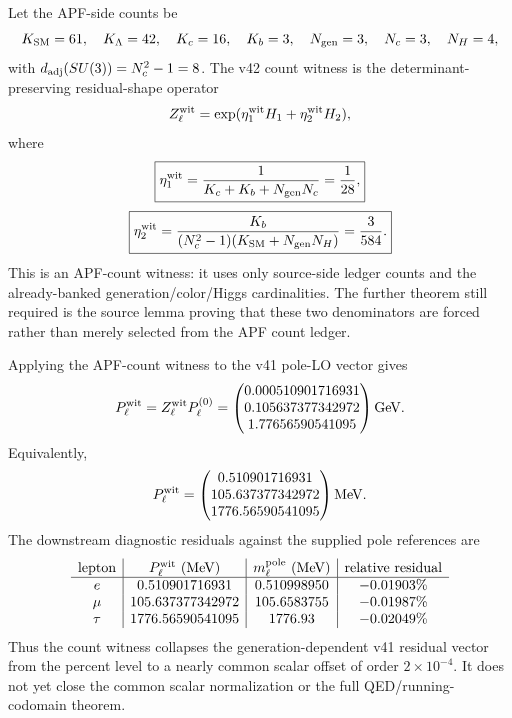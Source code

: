 \begin{definition}\label{def:apf-count-residual-witness-v42}
Let the APF-side counts be
\[
  K_{\rm SM}=61,\quad K_\Lambda=42,\quad K_c=16,\quad K_b=3,
  \quad N_{\rm gen}=3,\quad N_c=3,\quad N_H=4,
\]
with \(d_{\rm adj}(SU(3))=N_c^2-1=8\).  The v42 count witness is the determinant-preserving residual-shape operator
\[
  Z_\ell^{\rm wit}
  =\exp(\eta_1^{\rm wit}H_1+\eta_2^{\rm wit}H_2),
\]
where
\[
  \boxed{
  \eta_1^{\rm wit}
  ={1\over K_c+K_b+N_{\rm gen}N_c}
  ={1\over28},}
\]
\[
  \boxed{
  \eta_2^{\rm wit}
  ={K_b\over (N_c^2-1)(K_{\rm SM}+N_{\rm gen}N_H)}
  ={3\over584}.}
\]
This is an APF-count witness: it uses only source-side ledger counts and the already-banked generation/color/Higgs cardinalities.  The further theorem still required is the source lemma proving that these two denominators are forced rather than merely selected from the APF count ledger.
\end{definition}

\begin{theorem}\label{thm:charged-lepton-residual-shape-witness-v42}
Applying the APF-count witness to the v41 pole-LO vector gives
\[
  P_\ell^{\rm wit}
  =Z_\ell^{\rm wit}P_\ell^{(0)}
  =
  \begin{pmatrix}
  0.000510901716931\\
  0.105637377342972\\
  1.77656590541095
  \end{pmatrix}{\rm GeV}.
\]
Equivalently,
\[
  P_\ell^{\rm wit}
  =
  \begin{pmatrix}
  0.510901716931\\
  105.637377342972\\
  1776.56590541095
  \end{pmatrix}{\rm MeV}.
\]
The downstream diagnostic residuals against the supplied pole references are
\[
\begin{array}{c|c|c|c}
\text{lepton} & P_\ell^{\rm wit}\ (\mathrm{MeV}) & m_\ell^{\rm pole}\ (\mathrm{MeV}) & \text{relative residual}\\ \hline
 e   & 0.510901716931 & 0.510998950 & -0.01903\%\\
 \mu & 105.637377342972 & 105.6583755 & -0.01987\%\\
 \tau& 1776.56590541095 & 1776.93 & -0.02049\%
\end{array}
\]
Thus the count witness collapses the generation-dependent v41 residual vector from the percent level to a nearly common scalar offset of order \(2\times10^{-4}\).  It does not yet close the common scalar normalization or the full QED/running-codomain theorem.
\end{theorem}

